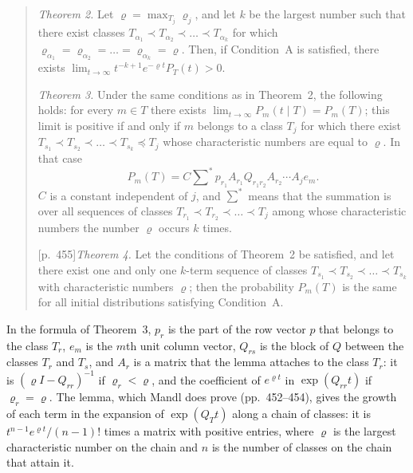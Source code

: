\documentclass[11pt]{article}
\theoremstyle{definition}
\theoremstyle{remark}
\begin{document}
\begin{quote}
\emph{Theorem 2.} Let $\varrho = \max_{T_j} \varrho_j$, and let $k$ be the largest number such
that there exist classes $T_{\alpha_1} \prec T_{\alpha_2} \prec \dots \prec T_{\alpha_k}$ for
which $\varrho_{\alpha_1} = \varrho_{\alpha_2} = \dots = \varrho_{\alpha_k} = \varrho$. Then, if
Condition~A is satisfied, there exists
$\lim_{t\to\infty} t^{-k+1} e^{-\varrho t} P_T(t) > 0$.

\emph{Theorem 3.} Under the same conditions as in Theorem~2, the following holds: for every
$m \in T$ there exists $\lim_{t\to\infty} P_m(t \mid T) = P_m(T)$; this limit is positive if and
only if $m$ belongs to a class $T_j$ for which there exist
$T_{s_1} \prec T_{s_2} \prec \dots \prec T_{s_k} \preceq T_j$ whose characteristic numbers are
equal to $\varrho$. In that case
\[
  P_m(T) = C \sum\nolimits^{*} p_{r_1} A_{r_1} Q_{r_1 r_2} A_{r_2} \cdots A_j e_m .
\]
$C$ is a constant independent of $j$, and $\sum^{*}$ means that the summation is over all
sequences of classes $T_{r_1} \prec T_{r_2} \prec \dots \prec T_j$ among whose characteristic
numbers the number $\varrho$ occurs $k$ times.

[p.~455]\enspace \emph{Theorem 4.} Let the conditions of Theorem~2 be satisfied, and let there
exist one and only one $k$-term sequence of classes
$T_{s_1} \prec T_{s_2} \prec \dots \prec T_{s_k}$ with characteristic numbers $\varrho$; then
the probability $P_m(T)$ is the same for all initial distributions satisfying Condition~A.
\end{quote}

In the formula of Theorem~3, $p_r$ is the part of the row vector $p$ that belongs to the class
$T_r$, $e_m$ is the $m$th unit column vector, $Q_{rs}$ is the block of $Q$ between the classes
$T_r$ and $T_s$, and $A_r$ is a matrix that the lemma attaches to the class $T_r$: it is
$(\varrho I - Q_{rr})^{-1}$ if $\varrho_r < \varrho$, and the coefficient of $e^{\varrho t}$ in
$\exp(Q_{rr} t)$ if $\varrho_r = \varrho$. The lemma, which Mandl does prove (pp.~452--454),
gives the growth of each term in the expansion of $\exp(Q_T t)$ along a chain of classes: it is
$t^{n-1} e^{\varrho t}/(n-1)!$ times a matrix with positive entries, where $\varrho$ is the
largest characteristic number on the chain and $n$ is the number of classes on the chain that
attain it.
\end{document}

